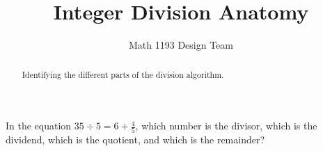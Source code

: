 \documentclass[noauthor]{ximera}
\title{Integer Division Anatomy}
\author{Math 1193 Design Team}
\begin{document}
\begin{abstract}
    Identifying the different parts of the division algorithm.
\end{abstract}
\maketitle

In the equation \(35 \div 5 = 6 + \frac{4}{5}\), which number
is the divisor, which is the dividend, which is the quotient, and 
which is the remainder?
\end{document}
